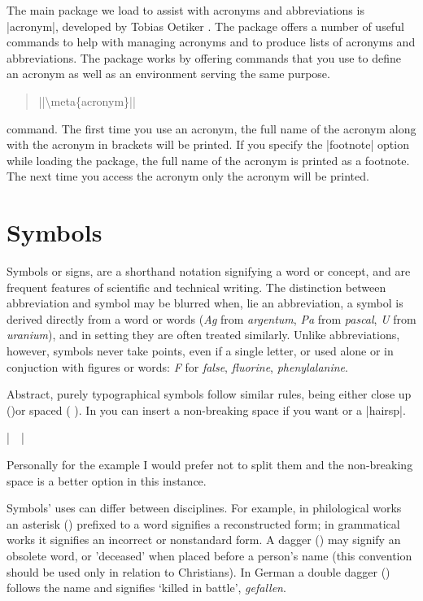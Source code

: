 The main package we load to assist with acronyms and abbreviations is |acronym|, developed by Tobias Oetiker \citeyearpar{acronym}. The package offers a number of useful commands to help with managing acronyms and to produce lists of acronyms and abbreviations. The package works by offering commands that you use to define an acronym as well as an environment serving the same purpose.

    
    \begin{quote}
     |\ac{|\meta{acronym}|}|
    \end{quote}
    command. The first time you use an acronym, the full name of the
    acronym along with the acronym in brackets will be printed. If you
    specify the |footnote| option while loading the package, the full
    name of the acronym is printed as a footnote.
    The next time you access the acronym only the acronym will
    be printed.

\section{Symbols}

Symbols or signs, are a shorthand notation signifying a word or concept, and are frequent features of scientific and technical writing. The distinction between abbreviation and symbol may be blurred when, lie an abbreviation, a symbol is derived directly from a word or words (\textit{Ag} from \textit{argentum}, \textit{Pa} from \textit{pascal}, \textit{U} from \textit{uranium}), and in setting they are often treated similarly. Unlike abbreviations, however, symbols never take points, even if a single letter, or used alone or in conjuction with figures or words: \textit{F}  for \textit{false}, \textit{fluorine}, \textit{phenylalanine}.

Abstract, purely typographical symbols follow similar rules, being either close up ()or spaced (  ). In \latex you can insert a non-breaking space if you want or a |hairsp|.

|~~|

Personally for the example I would prefer not to split them and the non-breaking space is a better option in this instance.

Symbols' uses can differ between disciplines. For example, in philological
works an asterisk (\textasteriskcentered) prefixed to a word signifies a reconstructed
form; in grammatical works it signifies an incorrect or nonstandard
form. A dagger (\textdagger) may signify an obsolete word, or 'deceased' when
placed before a person's name (this convention should be used only in
relation to Christians). In German a double dagger (\textdaggerdbl) follows the name
and signifies `killed in battle', \textit{gefallen}.

